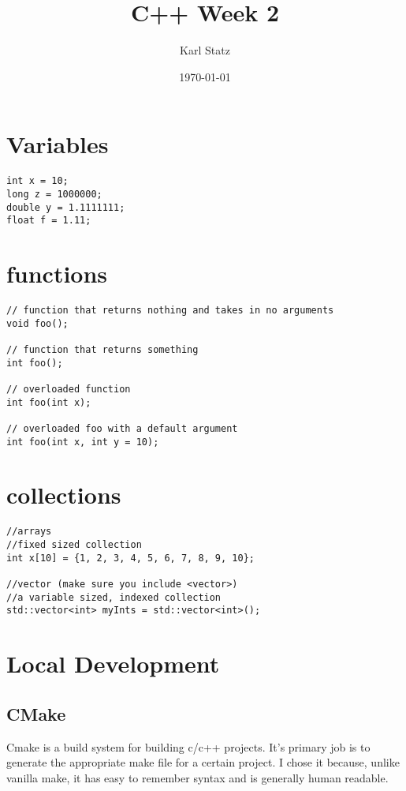 \documentclass[11pt]{article}
\author{Karl Statz}
\date{\today}
\title{C++ Week 2}
\begin{document}
\maketitle
\tableofcontents

\section{Variables}
\label{sec:org7506b7e}
\begin{verbatim}
int x = 10;
long z = 1000000;
double y = 1.1111111;
float f = 1.11;
\end{verbatim}
\section{functions}
\label{sec:orgb32b84b}
\begin{verbatim}
// function that returns nothing and takes in no arguments
void foo();

// function that returns something
int foo();

// overloaded function
int foo(int x);

// overloaded foo with a default argument
int foo(int x, int y = 10);
\end{verbatim}
\section{collections}
\label{sec:orge308cc3}
\begin{verbatim}
//arrays
//fixed sized collection
int x[10] = {1, 2, 3, 4, 5, 6, 7, 8, 9, 10};

//vector (make sure you include <vector>)
//a variable sized, indexed collection
std::vector<int> myInts = std::vector<int>();
\end{verbatim}
\section{Local Development}
\label{sec:org5bbf6dc}
\subsection{CMake}
\label{sec:orga5e561b}
Cmake is a build system for building c/c++ projects. It's primary job is to generate the appropriate make file for a certain project. I chose it because, unlike vanilla make, it has easy to remember syntax and is generally human readable.
\end{document}
